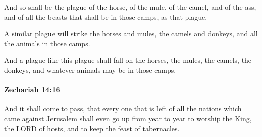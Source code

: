 			\begin{versebox}
					\item[BHS] 
					\item[LXX] 
					\item[ASV] And so shall be the plague of the horse, of the mule, of the camel, and of the ass, and of all the beasts that shall be in those camps, as that plague.
					\item[NIV] A similar plague will strike the horses and mules, the camels and donkeys, and all the animals in those camps.
					\item[NRSV] And a plague like this plague shall fall on the horses, the mules, the camels, the donkeys, and whatever animals may be in those camps.
			\end{versebox}

		\paragraph{Zechariah 14:16} %
			\label{ZECHARIAH-14-16}

			And it shall come to pass, that every one that is left of all the nations which came against Jerusalem shall even go up from year to year to worship the King, the LORD of hosts, and to keep the feast of tabernacles.

